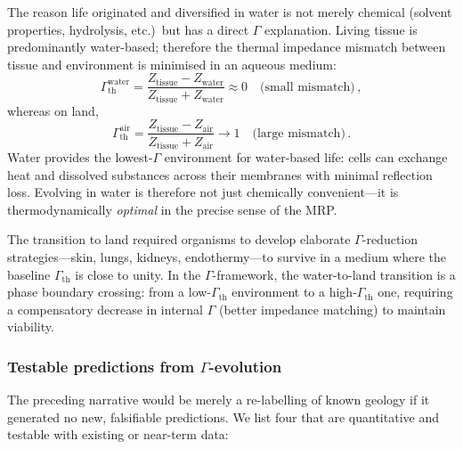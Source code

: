 \documentclass[aps,pre,twocolumn,superscriptaddress,floatfix]{revtex4-2}
\begin{document}
The reason life originated and diversified in water is not
merely chemical (solvent properties, hydrolysis, etc.)\ but
has a direct $\Gamma$ explanation.
Living tissue is predominantly water-based; therefore the
thermal impedance mismatch between tissue and environment
is minimised in an aqueous medium:
\begin{equation}
  \Gamma_{\text{th}}^{\text{water}}
  = \frac{Z_{\text{tissue}} - Z_{\text{water}}}
         {Z_{\text{tissue}} + Z_{\text{water}}}
  \approx 0
  \quad\text{(small mismatch)}\,,
  \label{eq:gamma-water}
\end{equation}
whereas on land,
\begin{equation}
  \Gamma_{\text{th}}^{\text{air}}
  = \frac{Z_{\text{tissue}} - Z_{\text{air}}}
         {Z_{\text{tissue}} + Z_{\text{air}}}
  \to 1
  \quad\text{(large mismatch)}\,.
  \label{eq:gamma-air}
\end{equation}
Water provides the lowest-$\Gamma$ environment for
water-based life: cells can exchange heat and dissolved
substances across their membranes with minimal reflection
loss.  Evolving in water is therefore not just chemically
convenient---it is thermodynamically \emph{optimal} in the
precise sense of the MRP.

The transition to land required organisms to develop
elaborate $\Gamma$-reduction strategies---skin, lungs,
kidneys, endothermy---to survive in a medium where the
baseline $\Gamma_{\text{th}}$ is close to unity.
In the $\Gamma$-framework, the water-to-land transition is
a phase boundary crossing: from a low-$\Gamma_{\text{th}}$
environment to a high-$\Gamma_{\text{th}}$ one, requiring a
compensatory decrease in internal $\Gamma$ (better impedance
matching) to maintain viability.

\subsubsection{Testable predictions from $\Gamma$-evolution}

The preceding narrative would be merely a re-labelling of
known geology if it generated no new, falsifiable predictions.
We list four that are quantitative and testable with
existing or near-term data:
\end{document}
